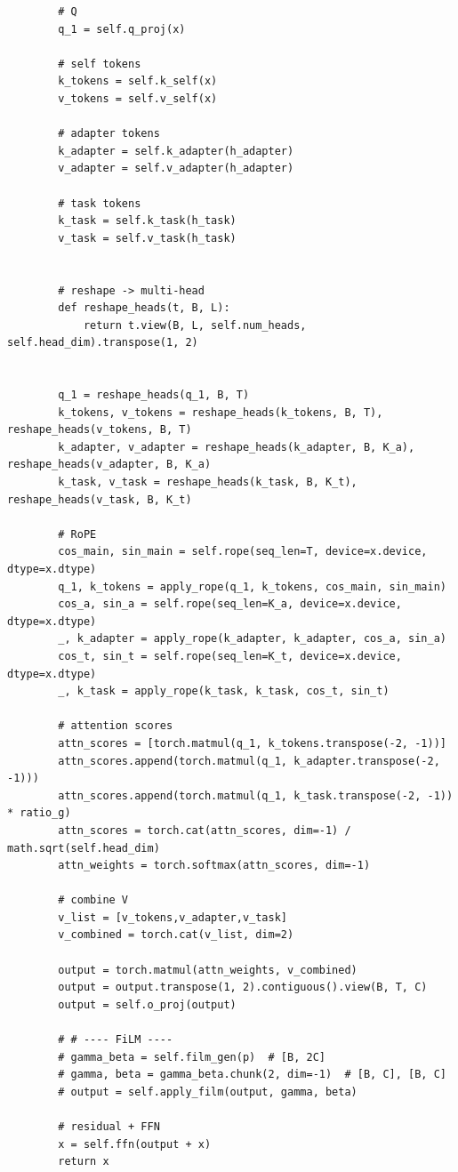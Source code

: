 {\begin{verbatim}
        # Q
        q_1 = self.q_proj(x)

        # self tokens
        k_tokens = self.k_self(x)
        v_tokens = self.v_self(x)

        # adapter tokens
        k_adapter = self.k_adapter(h_adapter)
        v_adapter = self.v_adapter(h_adapter)

        # task tokens
        k_task = self.k_task(h_task)
        v_task = self.v_task(h_task)


        # reshape -> multi-head
        def reshape_heads(t, B, L):
            return t.view(B, L, self.num_heads, self.head_dim).transpose(1, 2)


        q_1 = reshape_heads(q_1, B, T)
        k_tokens, v_tokens = reshape_heads(k_tokens, B, T), reshape_heads(v_tokens, B, T)
        k_adapter, v_adapter = reshape_heads(k_adapter, B, K_a), reshape_heads(v_adapter, B, K_a)
        k_task, v_task = reshape_heads(k_task, B, K_t), reshape_heads(v_task, B, K_t)

        # RoPE
        cos_main, sin_main = self.rope(seq_len=T, device=x.device, dtype=x.dtype)
        q_1, k_tokens = apply_rope(q_1, k_tokens, cos_main, sin_main)
        cos_a, sin_a = self.rope(seq_len=K_a, device=x.device, dtype=x.dtype)
        _, k_adapter = apply_rope(k_adapter, k_adapter, cos_a, sin_a)     
        cos_t, sin_t = self.rope(seq_len=K_t, device=x.device, dtype=x.dtype)
        _, k_task = apply_rope(k_task, k_task, cos_t, sin_t)

        # attention scores
        attn_scores = [torch.matmul(q_1, k_tokens.transpose(-2, -1))]
        attn_scores.append(torch.matmul(q_1, k_adapter.transpose(-2, -1)))
        attn_scores.append(torch.matmul(q_1, k_task.transpose(-2, -1)) * ratio_g)
        attn_scores = torch.cat(attn_scores, dim=-1) / math.sqrt(self.head_dim)
        attn_weights = torch.softmax(attn_scores, dim=-1)

        # combine V
        v_list = [v_tokens,v_adapter,v_task]
        v_combined = torch.cat(v_list, dim=2)

        output = torch.matmul(attn_weights, v_combined)
        output = output.transpose(1, 2).contiguous().view(B, T, C)
        output = self.o_proj(output)

        # # ---- FiLM ---- 
        # gamma_beta = self.film_gen(p)  # [B, 2C]
        # gamma, beta = gamma_beta.chunk(2, dim=-1)  # [B, C], [B, C]
        # output = self.apply_film(output, gamma, beta)

        # residual + FFN
        x = self.ffn(output + x)
        return x

\end{verbatim}
}

